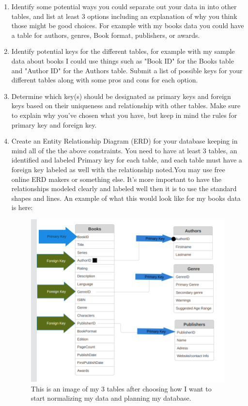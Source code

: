 \documentclass[12pt]{article}
\begin{document}
\begin{enumerate}
        \item Identify some potential ways you could separate out your data in into other tables, and list at least 3 options including an explanation of why you think those might be good choices. For example with my books data you could have a table for authors, genres, Book format, publishers, or awards.
        \item Identify potential keys for the different tables, for example with my sample data about books I could use things such as "Book ID" for the Books table and "Author ID" for the Authors table.  Submit a list of possible keys for your different tables along with some pros and cons for each option.
        \item Determine which key(s) should be designated as primary keys and foreign keys based on their uniqueness and relationship with other tables. Make sure to explain why you've chosen what you have, but keep in mind the rules for primary key and foreign key.
        \item Create an Entity Relationship Diagram (ERD) for your database keeping in mind all of the the above constraints.  You need to have at least 3 tables, an identified and labeled Primary key for each table, and each table must have a foreign key labeled as well with the relationship noted.You may use free online ERD makers or something else.  It's more important to have the relationships modeled clearly and labeled well then it is to use the standard shapes and lines. An example of what this would look like for my books data is here:
        
        \begin{figure}[h!]
            \centerline{\includegraphics[scale=.3]{TableMapOption3.png}}
            \caption{This is an image of my 3 tables after choosing how I want to start normalizing my data and planning my database.}

            \end{figure}

    \end{enumerate}
\end{document}
